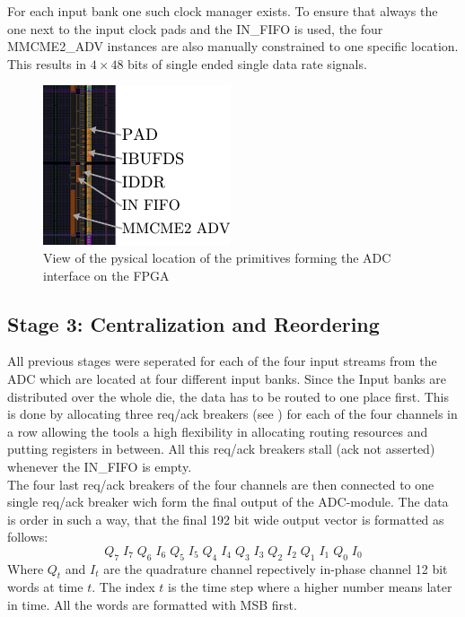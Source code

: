 For each input bank one such clock manager exists. To ensure that
always the one next to the input clock pads and the IN\_FIFO is
used, the four MMCME2\_ADV instances are also manually constrained to
one specific location. \\

This results in $4 \times 48$ bits of single ended single data rate signals.

\begin{figure}
  \centering
  \includegraphics{figures/adc_input_bank}
  \caption{View of the pysical location of the primitives forming the
    \gls{ADC} interface on the \gls{FPGA}}
  \label{fig:fpga_architecture_overview}
\end{figure}

\subsection{Stage 3: Centralization and Reordering}
All previous stages were seperated for each of the four input streams
from the \gls{ADC} which are located at four different input banks.
Since the Input banks are distributed over the whole die, the data
has to be routed to one place first. This is done by allocating
three req/ack breakers (see )
for each of the four channels in a row allowing the tools a high flexibility
in allocating routing resources and putting registers in between.
All this req/ack breakers stall (ack not asserted) whenever the IN\_FIFO
is empty. \\

The four last req/ack breakers of the four channels are then connected
to one single req/ack breaker wich form the final output of the
\gls{ADC}-module. The data is order in such a way, that the final 192 bit
wide output vector is formatted as follows:
\[Q_7\;I_7\;Q_6\;I_6\;Q_5\;I_5\;Q_4\;I_4\;Q_3\;I_3\;Q_2\;I_2\;Q_1\;I_1\;Q_0\;I_0\]
Where $Q_t$ and $I_t$ are the quadrature channel repectively in-phase channel
12 bit words at time $t$.
The index $t$ is the time step where a higher number means later in time.
All the words are formatted with \gls{MSB} first.

